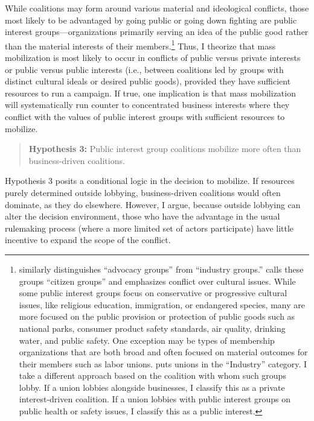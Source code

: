 \documentclass[
      12pt,
        ]{article}
\begin{document}
While coalitions may form around various material and ideological
conflicts, those most likely to be advantaged by going public or going
down fighting are public interest groups---organizations primarily
serving an idea of the public good rather than the material interests of
their members.\footnote{\citet{Potter2017} similarly distinguishes ``advocacy groups'' from
  ``industry groups.'' \citet{Berry1999} calls these groups ``citizen groups''
  and emphasizes conflict over cultural issues. While some public
  interest groups focus on conservative or progressive cultural
  issues, like religious education, immigration, or endangered
  species, many are more focused on the public provision or protection
  of public goods such as national parks, consumer product safety
  standards, air quality, drinking water, and public safety.
  One exception may be types of membership organizations that are both
  broad and often focused on material outcomes for their members such
  as labor unions. \citet{Potter2017} puts unions in the ``Industry'' category.
  I take a different approach based on the coalition with whom such
  groups lobby. If a union lobbies alongside businesses, I classify
  this as a private interest-driven coalition. If a union lobbies with
  public interest groups on public health or safety issues, I classify
  this as a public interest.} Thus, I theorize that mass mobilization is most
likely to occur in conflicts of public versus private interests or
public versus public interests (i.e., between coalitions led by groups
with distinct cultural ideals or desired public goods), provided they
have sufficient resources to run a campaign. If true, one implication is
that mass mobilization will systematically run counter to concentrated
business interests where they conflict with the values of public
interest groups with sufficient resources to mobilize.



\begin{quote}
\textbf{Hypothesis 3:} Public interest group coalitions mobilize more often than
business-driven coalitions.
\end{quote}

Hypothesis 3 posits a conditional logic in the
decision to mobilize. If resources purely determined outside lobbying,
business-driven coalitions would often dominate, as they do elsewhere.
However, I argue, because outside lobbying can alter the decision
environment, those who have the advantage in the usual rulemaking
process (where a more limited set of actors participate) have little
incentive to expand the scope of the conflict.
\end{document}
